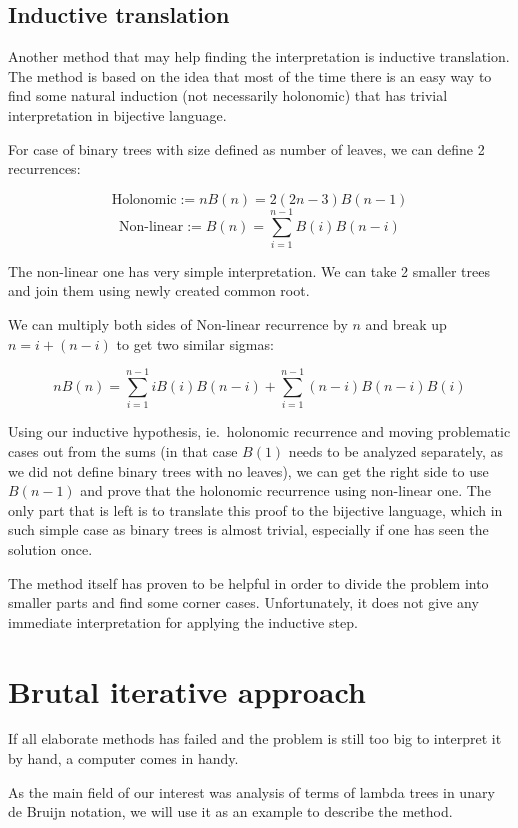 \documentclass[final]{article}
\theoremstyle{definition}
\theoremstyle{remark}
\begin{document}
\subsection{Inductive translation}%
\label{sub:inductive_translation}

Another method that may help finding the interpretation is inductive translation\cite{doron}. The method is based on the idea that most of the time there is an easy way to find some natural induction (not necessarily holonomic) that has trivial interpretation in bijective language.

For case of binary trees with size defined as number of leaves, we can define 2 recurrences:

\[\text{Holonomic} := nB(n) = 2 (2n - 3)B(n - 1)\]
\[\text{Non-linear} := B(n) = \sum_{i=1}^{n - 1} B(i) B(n - i)\]

The non-linear one has very simple interpretation. We can take 2 smaller trees and join them using newly created common root.

We can multiply both sides of Non-linear recurrence by \(n\) and break up \(n = i + (n - i)\) to get two similar sigmas:

\[n B(n) = \sum_{i=1}^{n - 1} i B(i) B(n - i) + \sum_{i=1}^{n - 1} (n - i) B(n - i) B(i)\]

Using our inductive hypothesis, ie.\ holonomic recurrence and moving problematic cases out from the sums (in that case \(B(1)\) needs to be analyzed separately, as we did not define binary trees with no leaves), we can get the right side to use \(B(n - 1)\) and prove that the holonomic recurrence using non-linear one. The only part that is left is to translate this proof to the bijective language, which in such simple case as binary trees is almost trivial, especially if one has seen the solution once.

The method itself has proven to be helpful in order to divide the problem into smaller parts and find some corner cases. Unfortunately, it does not give any immediate interpretation for applying the inductive step.

\section{Brutal iterative approach}%
\label{sec:brutal_iterative_approach}

If all elaborate methods has failed and the problem is still too big to interpret it by hand, a computer comes in handy.

As the main field of our interest was analysis of terms of lambda trees in unary de Bruijn notation, we will use it as an example to describe the method.
\end{document}
